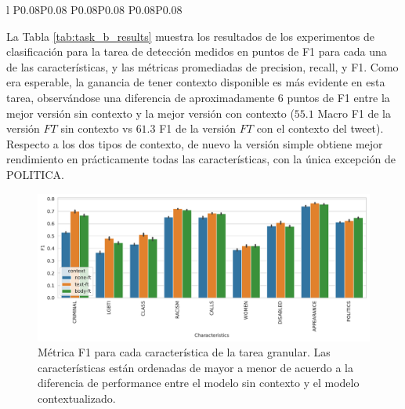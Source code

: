 \begin{table}
\begin{tabular}{l P{0.08\textwidth}P{0.08\textwidth} P{0.08\textwidth}P{0.08\textwidth}  P{0.08\textwidth}P{0.08\textwidth}}
        \bottomrule
        \end{tabular}
    \caption{Resultados de los experimentos de clasificación para la tarea \emph{granular} de detección de discurso de odio, expresados como la media de las distintas métricas sobre diez corridas independientes. Cada modelo es un BERT con tres posibles entradas: sólo el comentario (\emph{Sin contexto}), el tweet de la noticia a la cual responde el comentario (\emph{Tweet}), y el tweet más el cuerpo de la noticia (\emph{Tweet + Cuerpo}). Para cada una de estas posibilidades usamos dos versiones: una sobre BETO($\neg$FT) y otra sobre BETO ajustado al dominio (FT) de acuerdo a lo descripto en la Sección \ref{sec:contextualized_classifiers}}
    \label{tab:task_b_results}
\end{table}



La Tabla \ref{tab:task_b_results} muestra los resultados de los experimentos de clasificación para la tarea de detección  medidos en puntos de F1 para cada una de las características, y las métricas promediadas de precision, recall, y F1. Como era esperable, la ganancia de tener contexto disponible es más evidente en esta tarea, observándose una diferencia de aproximadamente 6 puntos de F1 entre la mejor versión sin contexto y la mejor versión con contexto ($55.1$ Macro F1 de la versión $FT$ sin contexto vs $61.3$ F1 de la versión $FT$ con el contexto del tweet). Respecto a los dos tipos de contexto, de nuevo la versión simple obtiene mejor rendimiento en prácticamente todas las características, con la única excepción de POLITICA.


\begin{figure}[]
    \centering
    \includegraphics[width=\textwidth]{img/task_b_scores.pdf}
    \caption{Métrica F1 para cada característica de la tarea granular. Las características están ordenadas de mayor a menor de acuerdo a la diferencia de performance entre el modelo sin contexto y el modelo contextualizado. }
    \label{fig:barplot_task_b_results}
\end{figure}

